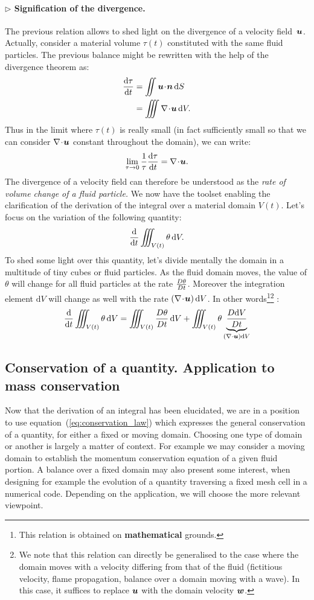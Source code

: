 \paragraph{$\rhd$ Signification of the divergence.} The previous relation allows to shed light on the divergence of a velocity field~$\bu$. Actually, consider a material volume $\tau(t)$ constituted with the same fluid particles. The previous balance might be rewritten with the help of the divergence theorem as:
\begin{align}
\dd{\tau}{t} &= \iint \bu \!\cdot\! \bn \, \dS\\
		&= \iiint \nabla \!\cdot\! \bu \, \dV.
\end{align}
Thus in the limit where $\tau(t)$ is really small (in fact sufficiently small so that we can consider  $\nabla \!\cdot\! \bu$ constant throughout the domain), we can write:
\begin{equation}
\lim_{\tau \to 0} \frac{1}{\tau} \dd{\tau}{t} = \nabla \!\cdot\! \bu.
\end{equation}
The divergence of a velocity field can therefore be understood as the \textit{rate of volume change of a fluid particle.}
 We now have the toolset enabling the clarification of the derivation of the integral over a material domain $V(t)$. Let's focus on the variation of the following quantity:
$$
\frac{\mathrm d }{\mathrm d t} \iiint_{V(t)} \theta \,\mathrm dV.
$$
To shed some light over this quantity, let's divide mentally the domain in a multitude of tiny cubes or fluid particles.
As the fluid domain moves, the value of $\theta$ will change for all fluid particles at the rate $\frac{D \theta}{D t}$. Moreover the integration element $\mathrm dV$ will change as well with the rate $\lp\nabla\!\cdot\!\bu\rp\mathrm dV$. In other words\footnote{This relation is obtained on \textbf{mathematical} grounds.}\footnote{We note that this relation can directly be generalised to the case where the domain moves with a velocity differing from that of the fluid (fictitious velocity, flame propagation, balance over a domain moving with a wave). In this case, it suffices to replace $\bu$ with the domain velocity $\bw$.}  :
\begin{equation}
\dd{}{t} \iiint_{V(t)} \theta \,\dV = \iiint_{V(t)} \D{\theta}{t} \,\dV + \iiint_{V(t)} \theta \underbrace{\D{\dV}{t}}_{\lp\nabla \cdot \bu\rp\dV}
\end{equation}
\subsection{Conservation of a quantity. Application to mass conservation}
Now that the derivation of an integral has been elucidated, we are in a position to use equation~(\ref{eq:conservation_law}) which expresses the general conservation of a quantity, for either a fixed or moving domain. Choosing one type of domain or another is largely a matter of context. For example we may consider a moving domain to establish the momentum conservation equation of a given fluid portion. A balance over a fixed domain may also present some interest, when designing for example the evolution of a quantity traversing a fixed mesh cell in a numerical code. Depending on the application, we will choose the more relevant viewpoint.

